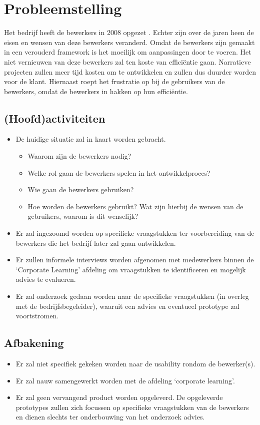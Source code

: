 \chapter{Probleemstelling}
Het bedrijf heeft de bewerkers in 2008 opgezet \cite{interviewivo}. Echter zijn over de jaren heen de eisen en wensen van deze bewerkers veranderd. Omdat de bewerkers zijn gemaakt in een verouderd framework is het moeilijk om aanpassingen door te voeren. Het niet vernieuwen van deze bewerkers zal ten koste van efficiëntie gaan. Narratieve projecten zullen meer tijd kosten om te ontwikkelen en zullen dus duurder worden voor de klant. Hiernaast roept het frustratie op bij de gebruikers van de bewerkers, omdat de bewerkers in hakken op hun efficiëntie.

\section{(Hoofd)activiteiten}
\begin{itemize}
    \item De huidige situatie zal in kaart worden gebracht.
    \begin{itemize}
        \item Waarom zijn de bewerkers nodig?
        \item Welke rol gaan de bewerkers spelen in het ontwikkelproces?
        \item Wie gaan de bewerkers gebruiken?
        \item Hoe worden de bewerkers gebruikt? Wat zijn hierbij de wensen van de gebruikers, waarom is dit wenselijk?
    \end{itemize}

    \item Er zal ingezoomd worden op specifieke vraagstukken ter voorbereiding van de bewerkers die het bedrijf later zal gaan ontwikkelen.
    \item Er zullen informele interviews worden afgenomen met medewerkers binnen de ‘Corporate Learning’ afdeling om vraagstukken te identificeren en mogelijk advies te evalueren.
    \item Er zal onderzoek gedaan worden naar de specifieke vraagstukken (in overleg met de bedrijfsbegeleider), waaruit een advies en eventueel prototype zal voortstromen.
\end{itemize}

\section{Afbakening}
\begin{itemize}
    \item Er zal niet specifiek gekeken worden naar de usability rondom de bewerker(s).
    \item Er zal nauw samengewerkt worden met de afdeling ‘corporate learning’.
    \item Er zal geen vervangend product worden opgeleverd. De opgeleverde prototypes zullen zich focussen op specifieke vraagstukken van de bewerkers en dienen slechts ter onderbouwing van het onderzoek advies.
\end{itemize}